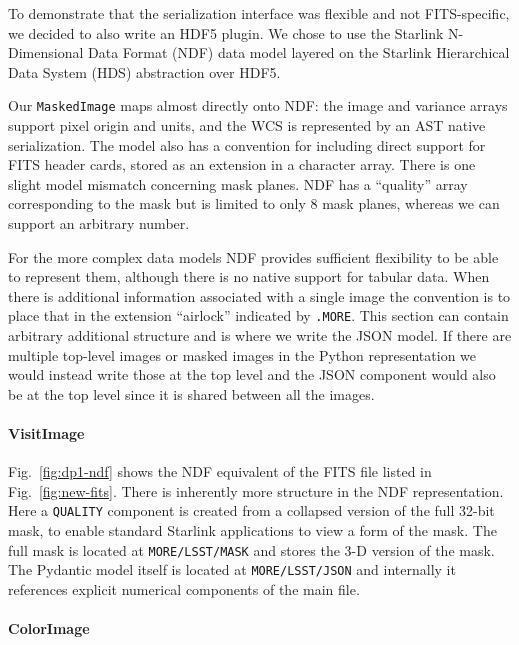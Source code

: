 To demonstrate that the serialization interface was flexible and not FITS-specific, we decided to also write an HDF5 plugin.
We chose to use the Starlink N-Dimensional Data Format (NDF) data model\cite{2015A&C....12..146J} layered on the Starlink Hierarchical Data System (HDS) abstraction over HDF5.\cite{2015A&C....12..221J}

Our \texttt{MaskedImage} maps almost directly onto NDF: the image and variance arrays support pixel origin and units, and the WCS is represented by an AST native serialization.
The model also has a convention for including direct support for FITS header cards, stored as an extension in a character array.
There is one slight model mismatch concerning mask planes.
NDF has a ``quality'' array corresponding to the mask but is limited to only 8 mask planes, whereas we can support an arbitrary number.

For the more complex data models NDF provides sufficient flexibility to be able to represent them, although there is no native support for tabular data.
When there is additional information associated with a single image the convention is to place that in the extension ``airlock'' indicated by \texttt{.MORE}.
This section can contain arbitrary additional structure and is where we write the JSON model.
If there are multiple top-level images or masked images in the Python representation we would instead write those at the top level and the JSON component would also be at the top level since it is shared between all the images.

\paragraph{VisitImage}

Fig.~\ref{fig:dp1-ndf} shows the NDF equivalent of the FITS file listed in Fig.~\ref{fig:new-fits}.
There is inherently more structure in the NDF representation.
Here a \texttt{QUALITY} component is created from a collapsed version of the full 32-bit mask, to enable standard Starlink applications to view a form of the mask.
The full mask is located at \texttt{MORE/LSST/MASK} and stores the 3-D version of the mask.
The Pydantic model itself is located at \texttt{MORE/LSST/JSON} and internally it references explicit numerical components of the main file.

\paragraph{ColorImage}

